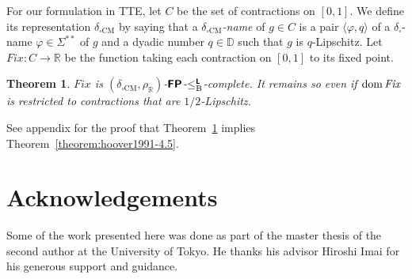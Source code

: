 \documentclass[conference]{IEEEtran}
\newcommand{\R}{\mathbb R}
\newcommand{\D}{\mathbb D}
\newcommand{\classtwofont}[1]{\text{\bfseries \sffamily \upshape #1}}
\newcommand{\classLtwo}{\classtwofont{L}}
\newcommand{\classFPtwo}{\classtwofont{FP}}
\newcommand{\deltabox}{\delta _\square}
\newcommand{\deltaboxCM}{\delta _{\square \mathrm{CM}}}
\newcommand{\rhoR}{\rho _\R}
\newcommand{\redB}{\leq _{\mathrm B}}
\newcommand{\redLB}{\redB ^{\classLtwo}}
\newcommand{\LM}{\varSigma ^{**}}
\newcommand{\OpCMFix}{\mathit{Fix}}
\newcommand{\dom}{\mathop{\rm dom}}
\newtheorem{theorem}{Theorem}[section]
\theoremstyle{definition}
\theoremstyle{remark}
\begin{document}
For our formulation in TTE, 
let $C$ be the set of contractions on $[0, 1]$. 
We define its representation $\deltaboxCM$ by saying that 
a \emph{$\deltaboxCM$-name} of $g \in C$
is a pair $\langle \varphi, q \rangle$ of 
a $\deltabox$-name $\varphi \in \LM$ of $g$ 
and a dyadic number $q \in \D$ such that $g$ is $q$-Lipschitz. 
Let $\OpCMFix \colon C \to \R$ be the function
taking each contraction on $[0, 1]$ to its fixed point.

\begin{theorem}
\label{theorem:P-hard-g_u}
$\OpCMFix$ is $(\deltaboxCM, \rhoR)$-$\classFPtwo$-$\redLB$-complete. 
It remains so even if $\dom \OpCMFix$ is restricted to contractions 
that are $1/2$-Lipschitz.
\end{theorem}

See appendix for the proof that Theorem~\ref{theorem:P-hard-g_u} 
implies Theorem~\ref{theorem:hoover1991-4.5}. 

\section*{Acknowledgements}
Some of the work presented here was done as part of the master thesis 
of the second author at the University of Tokyo.
He thanks his advisor Hiroshi Imai for 
his generous support and guidance.
\end{document}
